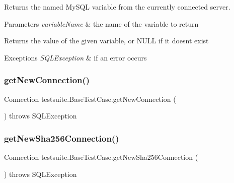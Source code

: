 Returns the named My\+S\+QL variable from the currently connected server.


\begin{DoxyParams}{Parameters}
{\em variable\+Name} & the name of the variable to return\\
\hline
\end{DoxyParams}
\begin{DoxyReturn}{Returns}
the value of the given variable, or N\+U\+LL if it doesn\textquotesingle{}t exist
\end{DoxyReturn}

\begin{DoxyExceptions}{Exceptions}
{\em S\+Q\+L\+Exception} & if an error occurs \\
\hline
\end{DoxyExceptions}
\mbox{\label{classtestsuite_1_1_base_test_case_af4fbedf355c4e4adc888e5acb709694f}} 
\subsubsection{\texorpdfstring{get\+New\+Connection()}{getNewConnection()}}
{\footnotesize\ttfamily Connection testsuite.\+Base\+Test\+Case.\+get\+New\+Connection (\begin{DoxyParamCaption}{ }\end{DoxyParamCaption}) throws S\+Q\+L\+Exception\hspace{0.3cm}{\ttfamily [protected]}}

\mbox{\label{classtestsuite_1_1_base_test_case_af0bcfb0a02343c87cca38ff29fae2f4d}} 
\subsubsection{\texorpdfstring{get\+New\+Sha256\+Connection()}{getNewSha256Connection()}}
{\footnotesize\ttfamily Connection testsuite.\+Base\+Test\+Case.\+get\+New\+Sha256\+Connection (\begin{DoxyParamCaption}{ }\end{DoxyParamCaption}) throws S\+Q\+L\+Exception\hspace{0.3cm}{\ttfamily [protected]}}

